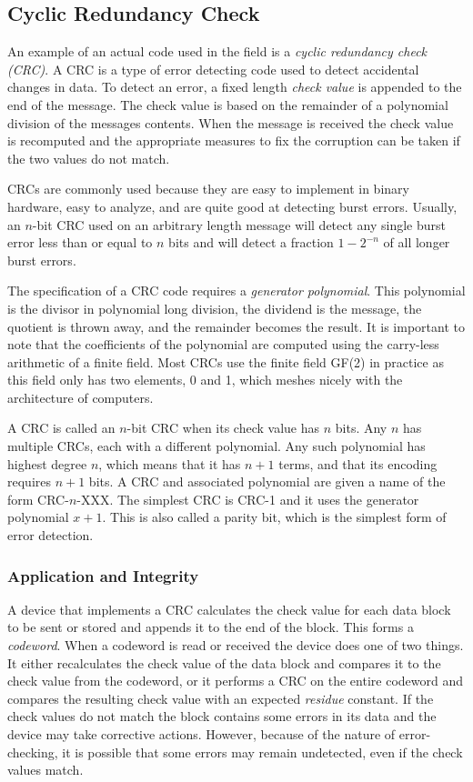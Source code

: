 \documentclass{article}
\begin{document}
\subsection{Cyclic Redundancy Check}
An example of an actual code used in the field is a \textit{cyclic redundancy check (CRC)}. A CRC is a type of error detecting code used to detect accidental changes in data. To detect an error, a fixed length \textit{check value} is appended to the end of the message. The check value is based on the remainder of a polynomial division of the messages contents. When the message is received the check value is recomputed and the appropriate measures to fix the corruption can be taken if the two values do not match.

CRCs are commonly used because they are easy to implement in binary hardware, easy to analyze, and are quite good at detecting burst errors. Usually, an $n$-bit CRC used on an arbitrary length message will detect any single burst error less than or equal to $n$ bits and will detect a fraction $1 - 2^{-n}$ of all longer burst errors. 

The specification of a CRC code requires a \textit{generator polynomial}. This polynomial is the divisor in polynomial long division, the dividend is the message, the quotient is thrown away, and the remainder becomes the result. It is important to note that the coefficients of the polynomial are computed using the carry-less arithmetic of a 
finite field. Most CRCs use the finite field GF(2) in practice as this field only has two elements, 0 and 1, which meshes nicely with the architecture of computers.

A CRC is called an $n$-bit CRC when its check value has $n$ bits. Any $n$ has multiple CRCs, each with a different polynomial. Any such polynomial has highest degree $n$, which means that it has $n + 1$ terms, and that its encoding requires $n + 1$ bits. A CRC and associated polynomial are given a name of the form CRC-$n$-XXX. The simplest CRC is CRC-1 and it uses the generator polynomial $x + 1$. This is also called a parity bit, which is the simplest form of error detection.

\subsubsection{Application and Integrity}
A device that implements a CRC calculates the check value for each data block to be sent or stored and appends it to the end of the block. This forms a \textit{codeword}. When a codeword is read or received the device does one of two things. It either recalculates the check value of the data block and compares it to the check value from the codeword, or it performs a CRC on the entire codeword and compares the resulting check value with an expected \textit{residue} constant. If the check values do not match the block contains some errors in its data and the device may take corrective actions. However, because of the nature of error-checking, it is possible that some errors may remain undetected, even if the check values match. 
\end{document}
